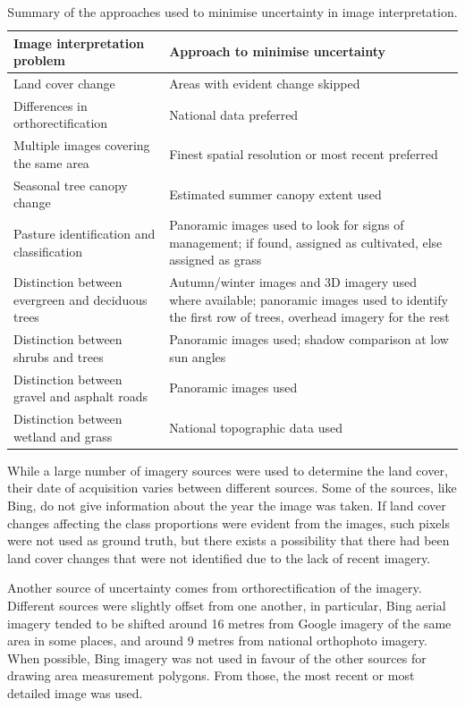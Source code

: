 \documentclass[a4paper,12pt]{scrbook}
\begin{document}
\begin{table}
  \centering
  \begin{tabular}{p{}p{}}
    Image interpretation problem & Approach to minimise uncertainty\\ \hline
    Land cover change & Areas with evident change skipped\\
    Differences in orthorectification & National data preferred\\
    Multiple images covering the same area & Finest spatial resolution or most recent preferred\\
    Seasonal tree canopy change & Estimated summer canopy extent used\\
    Pasture identification and classification & Panoramic images used to look for signs of management; if found, assigned as cultivated, else assigned as grass\\
    Distinction between evergreen and deciduous trees & Autumn/winter images and 3D imagery used where available; panoramic images used to identify the first row of trees, overhead imagery for the rest\\
    Distinction between shrubs and trees & Panoramic images used; shadow comparison at low sun angles\\
    Distinction between gravel and asphalt roads & Panoramic images used\\
    Distinction between wetland and grass & National topographic data used
  \end{tabular}
  \caption{Summary of the approaches used to minimise uncertainty in image interpretation.}
  \label{tbl-protocol}
\end{table}

While a large number of imagery sources were used to determine the land cover, their date of acquisition varies between different sources. Some of the sources, like Bing, do not give information about the year the image was taken. If land cover changes affecting the class proportions were evident from the images, such pixels were not used as ground truth, but there exists a possibility that there had been land cover changes that were not identified due to the lack of recent imagery.

Another source of uncertainty comes from orthorectification of the imagery. Different sources were slightly offset from one another, in particular, Bing aerial imagery tended to be shifted around 16 metres from Google imagery of the same area in some places, and around 9 metres from national orthophoto imagery. When possible, Bing imagery was not used in favour of the other sources for drawing area measurement polygons. From those, the most recent or most detailed image was used.
\end{document}
